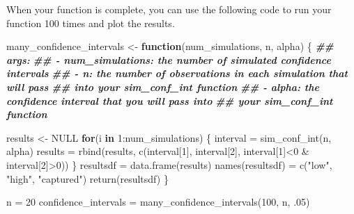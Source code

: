 \documentclass[
]{book}
\newenvironment{Shaded}{\begin{snugshade}}{\end{snugshade}}
\newcommand{\ConstantTok}[1]{\textcolor[rgb]{0.00,0.00,0.00}{#1}}
\newcommand{\ControlFlowTok}[1]{\textcolor[rgb]{0.13,0.29,0.53}{\textbf{#1}}}
\newcommand{\DecValTok}[1]{\textcolor[rgb]{0.00,0.00,0.81}{#1}}
\newcommand{\DocumentationTok}[1]{\textcolor[rgb]{0.56,0.35,0.01}{\textbf{\textit{#1}}}}
\newcommand{\FunctionTok}[1]{\textcolor[rgb]{0.00,0.00,0.00}{#1}}
\newcommand{\NormalTok}[1]{#1}
\newcommand{\OtherTok}[1]{\textcolor[rgb]{0.56,0.35,0.01}{#1}}
\newcommand{\SpecialCharTok}[1]{\textcolor[rgb]{0.00,0.00,0.00}{#1}}
\newcommand{\StringTok}[1]{\textcolor[rgb]{0.31,0.60,0.02}{#1}}
\theoremstyle{definition}
\theoremstyle{definition}
\theoremstyle{definition}
\theoremstyle{definition}
\theoremstyle{remark}
\begin{document}
When your function is complete, you can use the following code to run your function 100 times and plot the results.

\begin{Shaded}
\begin{Highlighting}[]
\NormalTok{many\_confidence\_intervals }\OtherTok{\textless{}{-}} \ControlFlowTok{function}\NormalTok{(num\_simulations, n, alpha) \{}
  \DocumentationTok{\#\# args: }
  \DocumentationTok{\#\#  {-} num\_simulations: the number of simulated confidence intervals }
  \DocumentationTok{\#\#  {-} n: the number of observations in each simulation that will pass }
  \DocumentationTok{\#\#           into your \textasciigrave{}sim\_conf\_int\textasciigrave{} function}
  \DocumentationTok{\#\#  {-} alpha: the confidence interval that you will pass into }
  \DocumentationTok{\#\#           your \textasciigrave{}sim\_conf\_int\textasciigrave{} function}
  
\NormalTok{  results }\OtherTok{\textless{}{-}} \ConstantTok{NULL}
  \ControlFlowTok{for}\NormalTok{(i }\ControlFlowTok{in} \DecValTok{1}\SpecialCharTok{:}\NormalTok{num\_simulations) \{}
\NormalTok{    interval }\OtherTok{=} \FunctionTok{sim\_conf\_int}\NormalTok{(n, alpha)}
\NormalTok{    results }\OtherTok{=} \FunctionTok{rbind}\NormalTok{(results, }\FunctionTok{c}\NormalTok{(interval[}\DecValTok{1}\NormalTok{], interval[}\DecValTok{2}\NormalTok{], interval[}\DecValTok{1}\NormalTok{]}\SpecialCharTok{\textless{}}\DecValTok{0} \SpecialCharTok{\&}\NormalTok{ interval[}\DecValTok{2}\NormalTok{]}\SpecialCharTok{\textgreater{}}\DecValTok{0}\NormalTok{))}
\NormalTok{  \}}
\NormalTok{  resultsdf }\OtherTok{=} \FunctionTok{data.frame}\NormalTok{(results)}
  \FunctionTok{names}\NormalTok{(resultsdf) }\OtherTok{=} \FunctionTok{c}\NormalTok{(}\StringTok{"low"}\NormalTok{, }\StringTok{"high"}\NormalTok{, }\StringTok{"captured"}\NormalTok{)}
  \FunctionTok{return}\NormalTok{(resultsdf)}
\NormalTok{\}}

\NormalTok{n }\OtherTok{=} \DecValTok{20}
\NormalTok{confidence\_intervals }\OtherTok{=} \FunctionTok{many\_confidence\_intervals}\NormalTok{(}\DecValTok{100}\NormalTok{, n, .}\DecValTok{05}\NormalTok{)}
\end{Highlighting}
\end{Shaded}
\end{document}
